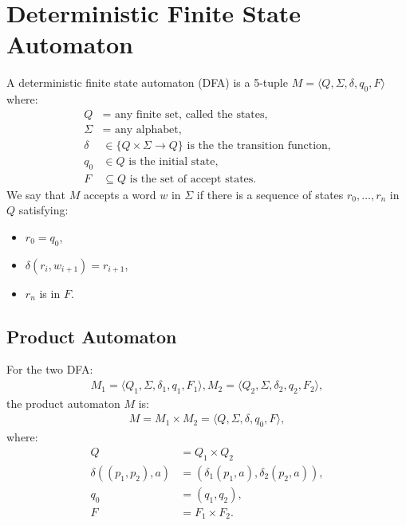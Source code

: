 \section{Deterministic Finite State Automaton}

A deterministic finite state automaton (DFA) is a 5-tuple 
$M = \langle Q, \Sigma, \delta, q_0, F \rangle$
where: \begin{align*}
    Q      &= \text{ any finite set, called the states,} \\
    \Sigma &= \text{ any alphabet,} \\ 
    \delta &\in \{ Q \times \Sigma \to Q \} \text{ is the the transition function,} \\
    q_0    &\in Q \text{ is the initial state,} \\
    F      &\subseteq Q \text{ is the set of accept states.}
\end{align*} We say that $M$ accepts a word $w$ in $\Sigma$
if there is a sequence of states $r_0, \ldots, r_n$ in $Q$
satisfying: \begin{itemize}
    \item $r_0 = q_0$,
    \item $\delta(r_i, w_{i + 1}) = r_{i + 1}$,
    \item $r_n$ is in $F$.
\end{itemize}

\subsection{Product Automaton}

For the two DFA: \begin{align*}
    M_1 = \langle Q_1, \Sigma, \delta_1, q_1, F_1 \rangle,
    M_2 = \langle Q_2, \Sigma, \delta_2, q_2, F_2 \rangle,
\end{align*} the product automaton $M$ is: \begin{gather*}
    M = M_1 \times M_2 = \langle Q, \Sigma, \delta, q_0, F \rangle,
\end{gather*} where: \begin{align*}
    Q &= Q_1 \times Q_2 \\
    \delta((p_1, p_2), a) &= (\delta_1(p_1, a), \delta_2(p_2, a)), \\
    q_0 &= (q_1, q_2), \\
    F &= F_1 \times F_2.
\end{align*}
